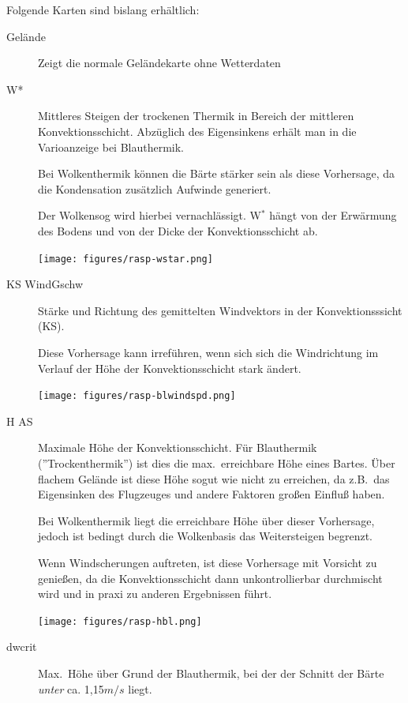 Folgende Karten sind bislang erhältlich:
\begin{description}
\item[Gelände] Zeigt die normale Geländekarte ohne Wetterdaten
\item[W*]
Mittleres Steigen  der trockenen Thermik in Bereich der mittleren Konvektionsschicht.
Abzüglich des Eigensinkens erhält man in die Varioanzeige  bei Blauthermik.

Bei Wolkenthermik können die Bärte stärker sein als diese Vorhersage,  da die
Kondensation zusätzlich Aufwinde generiert.

Der Wolkensog  wird hierbei vernachlässigt.
W$^\ast$ hängt von der Erwärmung des Bodens  und von der Dicke der
Konvektionsschicht ab.

\begin{center}
\texttt{[image: figures/rasp-wstar.png]}
\end{center}

\item[KS WindGschw]
Stärke und Richtung des gemittelten Windvektors  in der Konvektionsssicht (KS).

Diese Vorhersage kann irreführen, wenn sich sich die Windrichtung im Verlauf der
Höhe der Konvektionsschicht stark ändert.

\begin{center}
\texttt{[image: figures/rasp-blwindspd.png]}
\end{center}

\item[H AS]
Maximale Höhe der Konvektionsschicht.
Für Blauthermik (''Trockenthermik'') ist dies die max.\ erreichbare Höhe eines Bartes.
Über flachem Gelände ist diese Höhe sogut wie nicht zu erreichen, da z.B.\ das
Eigensinken des Flugzeuges und andere Faktoren großen Einfluß haben.

Bei Wolkenthermik liegt die erreichbare Höhe über dieser Vorhersage, jedoch ist
bedingt durch die Wolkenbasis das Weitersteigen begrenzt.

Wenn Windscherungen auftreten, ist diese Vorhersage mit Vorsicht zu genießen,
da die Konvektionsschicht dann unkontrollierbar durchmischt wird und in praxi zu
anderen Ergebnissen führt.

\begin{center}
\texttt{[image: figures/rasp-hbl.png]}
\end{center}

\item[dwcrit]
Max.\ Höhe über Grund der Blauthermik, bei der der Schnitt der Bärte  \textsl{unter} ca. 1,15$m/s$ liegt.


\end{description}
